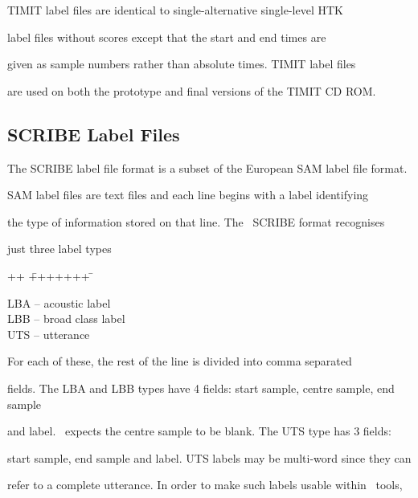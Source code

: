

TIMIT label files are identical to single-alternative single-level HTK


label files without scores except that the start and end times are


given as sample numbers rather than absolute times.  TIMIT label files


are used on both the prototype and final versions of the TIMIT CD ROM.





\subsection{SCRIBE Label Files}







The SCRIBE label file format is a subset of the European SAM label file format.


SAM label files are text files and each line begins with a label identifying


the type of information stored on that line.  The \HTK\ SCRIBE format recognises


just three label types


\begin{tabbing}


++ \= +++++++ \= \kill


\> LBA \>-- acoustic label \\


\> LBB \>-- broad class label \\


\> UTS \>-- utterance 


\end{tabbing}


For each of these, the rest of the line is divided into comma separated


fields.  The LBA and LBB types have 4 fields: start sample, centre sample, end sample


and label.  \HTK\ expects the centre sample to be blank.  The UTS type has 3 fields:


start sample, end sample and label.  UTS labels may be multi-word since they can


refer to a complete utterance.  In order to make such labels usable within \HTK\ tools,


